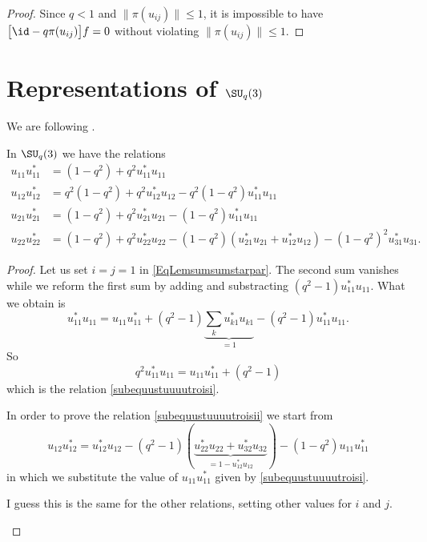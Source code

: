 \begin{proof}
    Since $q<1$ and $\| \pi(u_{ij}) \|\leq 1$, it is impossible to have $\big[ \id-q\pi(u_{ij}) \big]f=0$ without violating $\| \pi(u_{ij}) \|\leq 1$.
\end{proof}

\section{Representations of $\SU_q(3)$}

We are following \cite{Bragiel}.

\begin{lemma}       \label{Lemxijxstijsuqt}
    In \( \SU_q(3)\) we have the relations
    \begin{subequations}
        \begin{align}
            u_{11}u^*_{11}&=(1-q^2)+q^2u_{11}^*u_{11}       \label{subequustuuuutroisi}\\
            u_{12}u_{12}^*&=q^2(1-q^2)+q^2u_{12}^*u_{12}-q^2(1-q^2)u_{11}^*u_{11}   \label{subequustuuuutroisii}\\
            u_{21}u_{21}^*&=(1-q^2)+q^2u_{21}^*u_{21}-(1-q^2)u_{11}^*u_{11}\\
            u_{22}u_{22}^*&=(1-q^2)+q^2u_{22}^*u_{22}-(1-q^2)(u_{21}^*u_{21}+u_{12}^*u_{12})-(1-q^2)^2u_{31}^*u_{31}.
        \end{align}
    \end{subequations}
\end{lemma}

\begin{proof}
    Let us set \( i=j=1\) in \eqref{EqLemsumsumstarpar}. The second sum vanishes while we reform the first sum by adding and substracting \( (q^2-1)u_{11}^*u_{11}\). What we obtain is
    \begin{equation}
        u_{11}^*u_{11}=u_{11}u_{11}^*+(q^2-1)\underbrace{\sum_ku_{k1}^*u_{k1}}_{=1}-(q^2-1)u_{11}^*u_{11}.
    \end{equation}
    So
    \begin{equation}
        q^2u_{11}^*u_{11}=u_{11}u_{11}^*+(q^2-1)
    \end{equation}
    which is the relation \eqref{subequustuuuutroisi}.

    In order to prove the relation \eqref{subequustuuuutroisii} we start from
    \begin{equation}
        u_{12}u_{12}^*=u_{12}^*u_{12}-(q^2-1)(\underbrace{u_{22}^*u_{22}+u_{32}^*u_{32}}_{=1-u_{12}^*u_{12}})-(1-q^2)u_{11}u_{11}^*
    \end{equation}
    in which we substitute the value of \( u_{11}u_{11}^*\) given by \eqref{subequustuuuutroisi}.

    \begin{probleme}
        I guess this is the same for the other relations, setting other values for \( i\) and \( j\).
    \end{probleme}
\end{proof}

